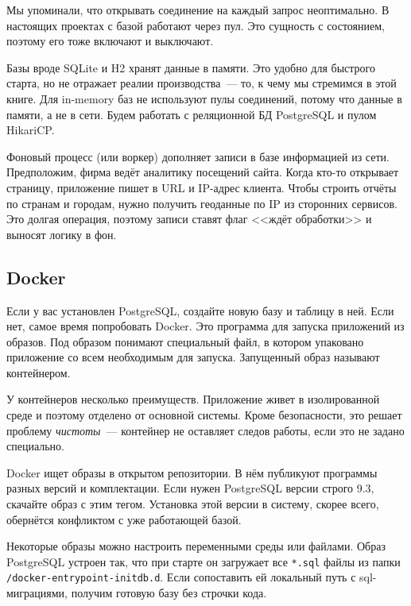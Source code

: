 Мы упоминали, что открывать соединение на каждый запрос неоптимально. В
настоящих проектах с базой работают через пул. Это сущность с состоянием,
поэтому его тоже включают и выключают.


Базы вроде SQLite и H2 хранят данные в памяти. Это удобно для быстрого старта,
но не отражает реалии производства~--- то, к чему мы стремимся в этой книге. Для
in-memory баз не используют пулы соединений, потому что данные в памяти, а не в
сети. Будем работать с реляционной БД PostgreSQL и пулом HikariCP.

Фоновый процесс (или воркер) дополняет записи в базе информацией из
сети. Предположим, фирма ведёт аналитику посещений сайта. Когда кто-то открывает
страницу, приложение пишет в URL и IP-адрес клиента. Чтобы строить отчёты по
странам и городам, нужно получить геоданные по IP из сторонних сервисов. Это
долгая операция, поэтому записи ставят флаг <<ждёт обработки>> и выносят логику
в фон.

\subsection{Docker}


\label{docker-db}

Если у вас установлен PostgreSQL, создайте новую базу и таблицу в ней. Если нет,
самое время попробовать Docker. Это программа для запуска приложений из
образов. Под образом понимают специальный файл, в котором упаковано приложение
со всем необходимым для запуска. Запущенный образ называют контейнером.

У контейнеров несколько преимуществ. Приложение живет в изолированной среде и
поэтому отделено от основной системы. Кроме безопасности, это решает проблему
\emph{чистоты}~--- контейнер не оставляет следов работы, если это не задано
специально.

Docker ищет образы в открытом репозитории. В нём публикуют программы разных
версий и комплектации. Если нужен PostgreSQL версии строго 9.3, скачайте образ с
этим тегом. Установка этой версии в систему, скорее всего, обернётся конфликтом
с уже работающей базой.

Некоторые образы можно настроить переменными среды или файлами. Образ PostgreSQL
устроен так, что при старте он загружает все \verb|*.sql| файлы из папки
\verb|/docker-entrypoint-initdb.d|. Если сопоставить ей локальный путь с
sql-миграциями, получим готовую базу без строчки кода.

